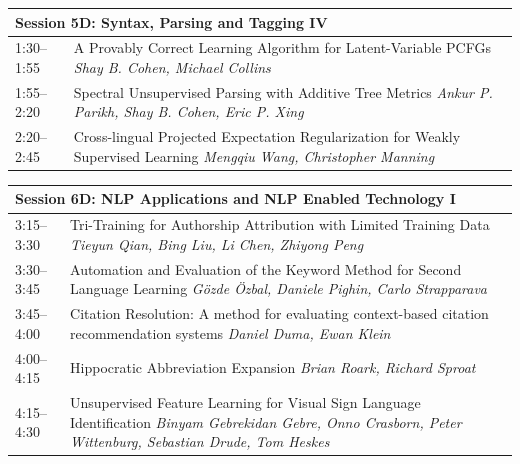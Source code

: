 \documentclass{book}
\renewcommand{\large}{\fontsize{36}{40}\selectfont}
\begin{document}
\begin{tabular}{p{3in}p{16in}}
  \multicolumn{2}{l}{\bfseries\large Session 5D: Syntax, Parsing and Tagging IV} \\\hline

    
    1:30--1:55
    &	A Provably Correct Learning Algorithm for Latent-Variable PCFGs \newline 
    {\itshape Shay B. Cohen, Michael Collins} \\
    
    1:55--2:20
    &	Spectral Unsupervised Parsing with Additive Tree Metrics \newline 
    {\itshape Ankur P. Parikh, Shay B. Cohen, Eric P. Xing} \\
    
    2:20--2:45
    &	Cross-lingual Projected Expectation Regularization for Weakly Supervised Learning \newline 
    {\itshape Mengqiu Wang, Christopher Manning} \\
    
\end{tabular}

\begin{tabular}{p{3in}p{16in}}
  \multicolumn{2}{l}{\bfseries\large Session 6D: NLP Applications and NLP Enabled Technology I} \\\hline

    
    3:15--3:30
    &	Tri-Training for Authorship Attribution with Limited Training Data \newline 
    {\itshape Tieyun Qian, Bing Liu, Li Chen, Zhiyong Peng} \\
    
    3:30--3:45
    &	Automation and Evaluation of the Keyword Method for Second Language Learning \newline 
    {\itshape Gözde Özbal, Daniele Pighin, Carlo Strapparava} \\
    
    3:45--4:00
    &	Citation Resolution: A method for evaluating context-based citation recommendation systems \newline 
    {\itshape Daniel Duma, Ewan Klein} \\
    
    4:00--4:15
    &	Hippocratic Abbreviation Expansion \newline 
    {\itshape Brian Roark, Richard Sproat} \\
    
    4:15--4:30
    &	Unsupervised Feature Learning for Visual Sign Language Identification \newline 
    {\itshape Binyam Gebrekidan Gebre, Onno Crasborn, Peter Wittenburg, Sebastian Drude, Tom Heskes} \\
    
\end{tabular}
\end{document}
